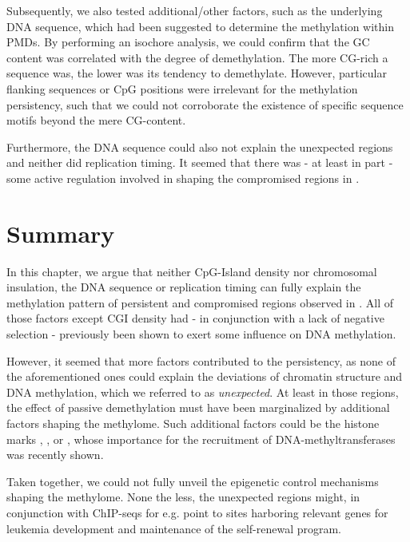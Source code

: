 Subsequently, we also tested additional/other factors, such as the underlying DNA sequence, which had been suggested to determine the methylation within PMDs\cite{Gaidatzis2014}. By performing an isochore analysis\cite{Thiery1976}, we could confirm that the GC content was correlated with the degree of demethylation. The more CG-rich a sequence was, the lower was its tendency to demethylate\dns. However, particular flanking sequences or CpG positions were irrelevant for the methylation persistency, such that we could not corroborate the existence of specific sequence motifs beyond the mere CG-content. 

Furthermore, the DNA sequence could also not explain the unexpected regions and neither did replication timing\cite{Aran2011}\dns. It seemed that there was - at least in part - some active regulation involved in shaping the compromised regions in \dnmtchip. 

\section{Summary}
\label{chap:r:persistency:summary}

In this chapter, we argue that neither CpG-Island density nor chromosomal insulation, the DNA sequence or replication timing can fully explain the methylation pattern of persistent and compromised regions observed in \dnmtchip. All of those factors except CGI density had -  in conjunction with a lack of negative selection - previously been shown to exert some influence on DNA methylation.  

However, it seemed that more factors contributed to the persistency, as none of the aforementioned ones could explain the deviations of chromatin structure and DNA methylation, which we referred to as \emph{unexpected}. At least in those regions, the effect of passive demethylation must have been marginalized by additional factors shaping the methylome. Such additional factors could be the histone marks \histwoarg, \hisninethree, \hiseighteenub or \histwentythreeub, whose importance for the recruitment of DNA-methyltransferases was recently shown\cite{Veland2017,DaRosa2018,Li2018a}. 

Taken together, we could not fully unveil the epigenetic control mechanisms shaping the \dnmtchip methylome. None the less, the unexpected regions might, in conjunction with ChIP-seqs for e.g. \histwoarg point to sites harboring relevant genes for leukemia development and maintenance of the self-renewal program. 